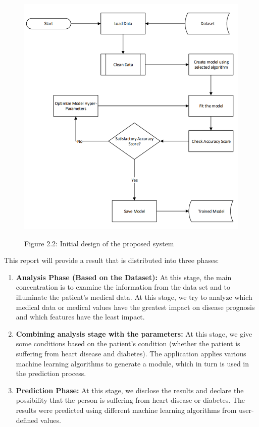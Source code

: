 \documentclass[oneside,12pt]{Classes/VTU}
\begin{document}
    	\begin{figure}
    		\begin{center}
    			\includegraphics[]{images/df.png}
    		\end{center}
    		
    		\begin{center}
				Figure 2.2: Initial design of the proposed system
    		\end{center}
    	\end{figure}
    	
    	
    	This report will provide a result that is distributed into three phases:
    
    	\begin{enumerate}
    		\item \textbf{Analysis Phase (Based on the Dataset): } At this stage, the main concentration is to examine the information from the data set and to illuminate the patient's medical data. At this stage, we try to analyze which medical data or medical values have the greatest impact on disease prognosis and which features have the least impact.
    	\item \textbf{Combining analysis stage with the parameters:} At this stage, we give some conditions based on the patient's condition (whether the patient is suffering from heart disease and diabetes). The application applies various machine learning algorithms to generate a module, which in turn is used in the prediction process.  
    	\item \textbf{Prediction Phase:} At this stage, we disclose the results and declare the possibility that the person is suffering from heart disease or diabetes. The results were predicted using different machine learning algorithms from user-defined values.
    	\end{enumerate}
    	
\end{document}
